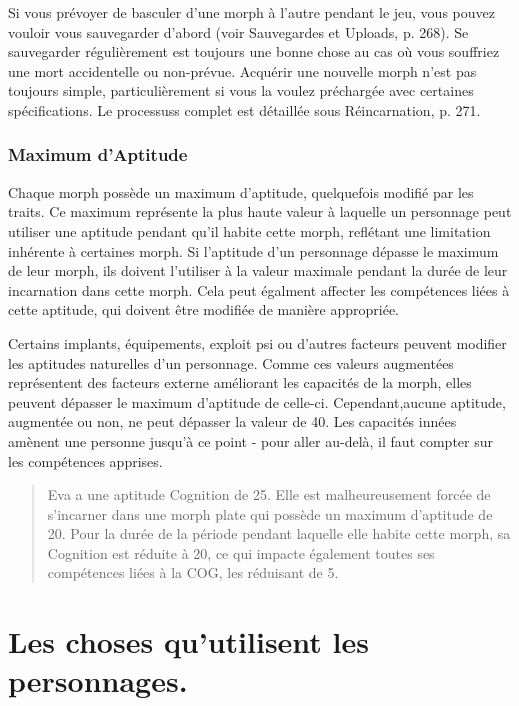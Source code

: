 Si vous prévoyer de basculer d'une morph à l'autre pendant le jeu, vous pouvez vouloir vous sauvegarder d'abord (voir Sauvegardes et Uploads, p. 268). Se sauvegarder régulièrement est toujours une bonne chose au cas où vous souffriez une mort accidentelle ou non-prévue. Acquérir une nouvelle morph n'est pas toujours simple, particulièrement si vous la voulez préchargée avec certaines spécifications. Le processuss complet est détaillée sous Réincarnation, p. 271. 

\subsubsection{Maximum d'Aptitude} \label{sec:aptitude-maximums} 

Chaque morph possède un maximum d'aptitude, quelquefois modifié par les traits. Ce maximum représente la plus haute valeur à laquelle un personnage peut utiliser une aptitude pendant qu'il habite cette morph, reflétant une limitation inhérente à certaines morph. Si l'aptitude d'un personnage dépasse le maximum de leur morph, ils doivent l'utiliser à la valeur maximale pendant la durée de leur incarnation dans cette morph. Cela peut égalment affecter les compétences liées à cette aptitude, qui doivent être modifiée de manière appropriée. 

Certains implants, équipements, exploit psi ou d'autres facteurs peuvent modifier les aptitudes naturelles d'un personnage. Comme ces valeurs augmentées représentent des facteurs externe améliorant les capacités de la morph, elles peuvent dépasser le maximum d'aptitude de celle-ci. Cependant,aucune aptitude, augmentée ou non, ne peut dépasser la valeur de 40. Les capacités innées amènent une personne jusqu'à ce point - pour aller au-delà, il faut compter sur les compétences apprises. 

\begin{quotation} Eva a une aptitude Cognition de 25. Elle est malheureusement forcée de s'incarner dans une morph plate qui possède un maximum d'aptitude de 20. Pour la durée de la période pendant laquelle elle habite cette morph, sa Cognition est réduite à 20, ce qui impacte également toutes ses compétences liées à la COG, les réduisant de 5. \end{quotation} 

\section{Les choses qu'utilisent les personnages.} \label{sec:things-char-use} 

